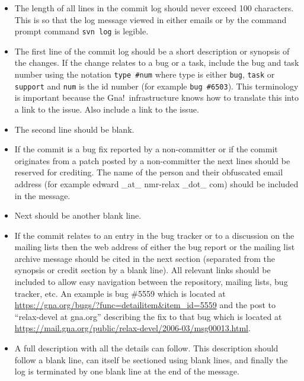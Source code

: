\begin{itemize}
\item The length of all lines in the commit log should never exceed 100 characters.  This is so that the log message viewed in either emails or by the command prompt command \mbox{\texttt{svn log}} is legible.

\item The first line of the commit log should be a short description or synopsis of the changes.  If the change relates to a bug or a task, include the bug and task number using the notation \texttt{type \#num} where type is either \texttt{bug}, \texttt{task} or \texttt{support} and \texttt{num} is the id number (for example \texttt{bug \#6503}).  This terminology is important because the Gna!\ infrastructure knows how to translate this into a link to the issue.  Also include a link to the issue.

\item The second line should be blank.

\item If the commit is a bug fix reported by a non-committer or if the commit originates from a patch posted by a non-committer the next lines should be reserved for crediting.  The name of the person and their obfuscated email address (for example edward \_at\_ nmr-relax \_dot\_ com) should be included in the message.

\item Next should be another blank line.

\item If the commit relates to an entry in the bug tracker or to a discussion on the mailing lists then the web address of either the bug report or the mailing list archive message should be cited in the next section (separated from the synopsis or credit section by a blank line).  All relevant links should be included to allow easy navigation between the repository, mailing lists, bug tracker, etc.  An example is bug \#5559 which is located at \href{https://gna.org/bugs/?func=detailitem\&item\_id=5559}{https://gna.org/bugs/?func=detailitem\&item\_id=5559} and the post to ``relax-devel at gna.org'' describing the fix to that bug which is located at \href{https://mail.gna.org/public/relax-devel/2006-03/msg00013.html}{https://mail.gna.org/public/relax-devel/2006-03/msg00013.html}.

\item A full description with all the details can follow.  This description should follow a blank line, can itself be sectioned using blank lines, and finally the log is terminated by one blank line at the end of the message.
\end{itemize}

